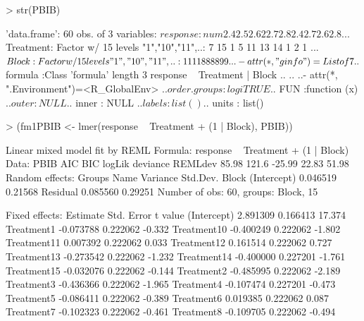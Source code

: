 \documentclass[12pt]{article}
\begin{document}
\begin{Schunk}
\begin{Sinput}
> str(PBIB)
\end{Sinput}
\begin{Soutput}
'data.frame':	60 obs. of  3 variables:
 $ response : num  2.4 2.5 2.6 2 2.7 2.8 2.4 2.7 2.6 2.8 ...
 $ Treatment: Factor w/ 15 levels "1","10","11",..: 7 15 1 5 11 13 14 1 2 1 ...
 $ Block    : Factor w/ 15 levels "1","10","11",..: 1 1 1 1 8 8 8 8 9 9 ...
 - attr(*, "ginfo")=List of 7
  ..$ formula     :Class 'formula' length 3 response ~ Treatment | Block
  .. .. ..- attr(*, ".Environment")=<R_GlobalEnv> 
  ..$ order.groups: logi TRUE
  ..$ FUN         :function (x)  
  ..$ outer       : NULL
  ..$ inner       : NULL
  ..$ labels      : list()
  ..$ units       : list()
\end{Soutput}
\begin{Sinput}
> (fm1PBIB <- lmer(response ~ Treatment + (1 | Block), PBIB))
\end{Sinput}
\begin{Soutput}
Linear mixed model fit by REML 
Formula: response ~ Treatment + (1 | Block) 
   Data: PBIB 
   AIC   BIC logLik deviance REMLdev
 85.98 121.6 -25.99    22.83   51.98
Random effects:
 Groups   Name        Variance Std.Dev.
 Block    (Intercept) 0.046519 0.21568 
 Residual             0.085560 0.29251 
Number of obs: 60, groups: Block, 15

Fixed effects:
             Estimate Std. Error t value
(Intercept)  2.891309   0.166413  17.374
Treatment1  -0.073788   0.222062  -0.332
Treatment10 -0.400249   0.222062  -1.802
Treatment11  0.007392   0.222062   0.033
Treatment12  0.161514   0.222062   0.727
Treatment13 -0.273542   0.222062  -1.232
Treatment14 -0.400000   0.227201  -1.761
Treatment15 -0.032076   0.222062  -0.144
Treatment2  -0.485995   0.222062  -2.189
Treatment3  -0.436366   0.222062  -1.965
Treatment4  -0.107474   0.227201  -0.473
Treatment5  -0.086411   0.222062  -0.389
Treatment6   0.019385   0.222062   0.087
Treatment7  -0.102323   0.222062  -0.461
Treatment8  -0.109705   0.222062  -0.494


\end{Soutput}
\end{Schunk}
\end{document}
